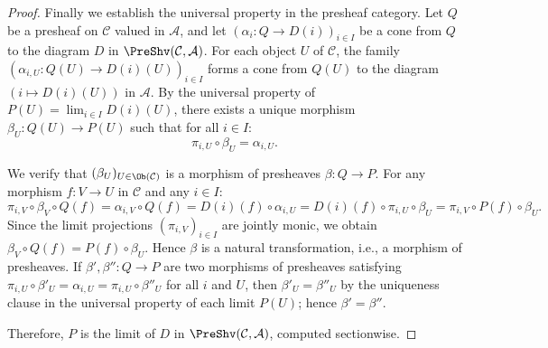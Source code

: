 \begin{proof}
Finally we establish the universal property in the presheaf category. Let $Q$ be a presheaf on $\mathcal{C}$ valued in $\mathcal{A}$, and let $(\alpha_i: Q \to D(i))_{i \in I}$ be a cone from $Q$ to the diagram $D$ in $\PreShv(\mathcal{C}, \mathcal{A})$. For each object $U$ of $\mathcal{C}$, the family $(\alpha_{i,U}: Q(U) \to D(i)(U))_{i \in I}$ forms a cone from $Q(U)$ to the diagram $(i \mapsto D(i)(U))$ in $\mathcal{A}$. By the universal property of $P(U) = \lim_{i \in I} D(i)(U)$, there exists a unique morphism $\beta_U: Q(U) \to P(U)$ such that for all $i \in I$:
\[
\pi_{i,U} \circ \beta_U = \alpha_{i,U}.
\]

We verify that $(\beta_U)_{U \in \Ob(\mathcal{C})}$ is a morphism of presheaves $\beta: Q \to P$. For any morphism $f: V \to U$ in $\mathcal{C}$ and any $i \in I$:
\[
\pi_{i,V} \circ \beta_V \circ Q(f) = \alpha_{i,V} \circ Q(f) = D(i)(f) \circ \alpha_{i,U} = D(i)(f) \circ \pi_{i,U} \circ \beta_U = \pi_{i,V} \circ P(f) \circ \beta_U.
\]
Since the limit projections $(\pi_{i,V})_{i \in I}$ are jointly monic, we obtain $\beta_V \circ Q(f) = P(f) \circ \beta_U$. Hence $\beta$ is a natural transformation, i.e., a morphism of presheaves. If $\beta', \beta'': Q \to P$ are two morphisms of presheaves satisfying $\pi_{i,U} \circ \beta'_U = \alpha_{i,U} = \pi_{i,U} \circ \beta''_U$ for all $i$ and $U$, then $\beta'_U = \beta''_U$ by the uniqueness clause in the universal property of each limit $P(U)$; hence $\beta' = \beta''$.

Therefore, $P$ is the limit of $D$ in $\PreShv(\mathcal{C}, \mathcal{A})$, computed sectionwise.
\end{proof}
